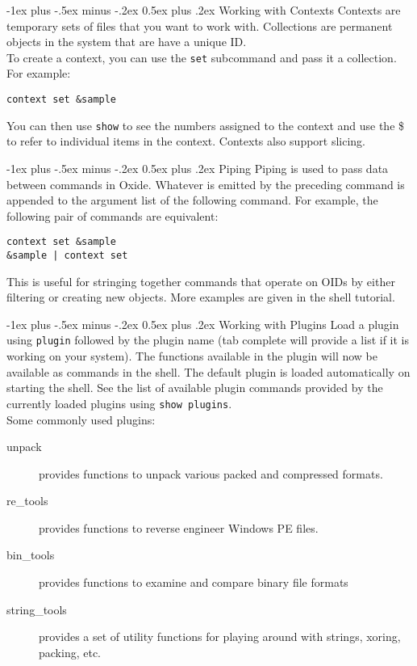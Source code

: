 \documentclass[10pt,landscape]{article}
\makeatletter
\renewcommand{\section}{\@startsection{section}{1}{0mm}%
                                {-1ex plus -.5ex minus -.2ex}%
                                {0.5ex plus .2ex}%
                                {\normalfont\large\bfseries}}
\makeatother
\begin{document}
\begin{multicols}{3}
\section{Working with Contexts}
Contexts are temporary sets of files that you want to work with.  Collections are permanent objects in the system that are have a unique ID. \\
To create a context, you can use the \verb!set! subcommand and pass it a collection.  For example:
\begin{verbatim}
context set &sample
\end{verbatim}
You can then use \verb!show! to see the numbers assigned to the context and use the \$ to refer to individual items in the context. 
Contexts also support slicing.

\section{Piping}
Piping is used to pass data between commands in Oxide.  Whatever is emitted by the preceding command is appended to the argument list of the 
following command.  For example, the following pair of commands are equivalent:
\begin{verbatim}
context set &sample
&sample | context set
\end{verbatim}
This is useful for stringing together commands that operate on OIDs by either filtering or creating new objects.  More examples are given in the shell tutorial.

\section{Working with Plugins}
Load a plugin using \verb!plugin! followed by the plugin name (tab complete will provide a list if it is working on your system).  The functions available in the plugin
will now be available as commands in the shell.  The default plugin is loaded automatically on starting the shell.  See the list of available plugin commands provided 
by the currently loaded plugins using \verb!show plugins!. \\
Some commonly used plugins:
\begin{description}
  \item[unpack] provides functions to unpack various packed and compressed formats.
  \item[re\_tools] provides functions to reverse engineer Windows PE files.
  \item[bin\_tools] provides functions to examine and compare binary file formats
  \item[string\_tools] provides a set of utility functions for playing around with strings, xoring, packing, etc.
\end{description}


\end{multicols}
\end{document}
